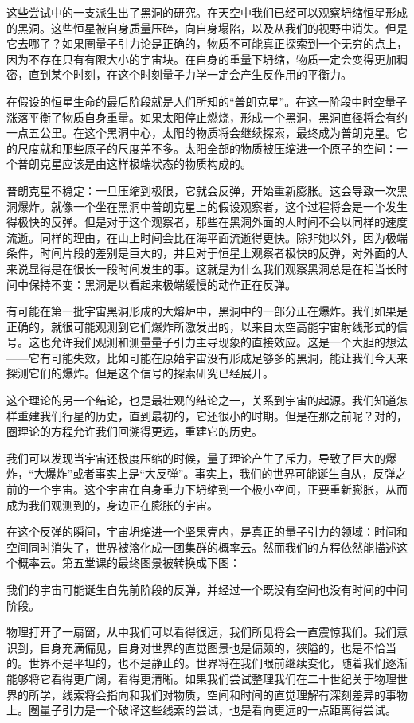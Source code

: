    这些尝试中的一支派生出了黑洞的研究。在天空中我们已经可以观察坍缩恒星形成的黑洞。这些恒星被自身质量压碎，向自身塌陷，以及从我们的视野中消失。但是它去哪了？如果圈量子引力论是正确的，物质不可能真正探索到一个无穷的点上，因为不存在只有有限大小的宇宙块。在自身的重量下坍缩，物质一定会变得更加稠密，直到某个时刻，在这个时刻量子力学一定会产生反作用的平衡力。

   在假设的恒星生命的最后阶段就是人们所知的“普朗克星”。在这一阶段中时空量子涨落平衡了物质自身重量。如果太阳停止燃烧，形成一个黑洞，黑洞直径将会有约一点五公里。在这个黑洞中心，太阳的物质将会继续探索，最终成为普朗克星。它的尺度就和那些原子的尺度差不多。太阳全部的物质被压缩进一个原子的空间：一个普朗克星应该是由这样极端状态的物质构成的。

   普朗克星不稳定：一旦压缩到极限，它就会反弹，开始重新膨胀。这会导致一次黑洞爆炸。就像一个坐在黑洞中普朗克星上的假设观察者，这个过程将会是一个发生得极快的反弹。但是对于这个观察者，那些在黑洞外面的人时间不会以同样的速度流逝。同样的理由，在山上时间会比在海平面流逝得更快。除非她以外，因为极端条件，时间片段的差别是巨大的，并且对于恒星上观察者极快的反弹，对外面的人来说显得是在很长一段时间发生的事。这就是为什么我们观察黑洞总是在相当长时间中保持不变：黑洞是以看起来极端缓慢的动作正在反弹。

   有可能在第一批宇宙黑洞形成的大熔炉中，黑洞中的一部分正在爆炸。我们如果是正确的，就很可能观测到它们爆炸所激发出的，以来自太空高能宇宙射线形式的信号。这也允许我们观测和测量量子引力主导现象的直接效应。这是一个大胆的想法——它有可能失效，比如可能在原始宇宙没有形成足够多的黑洞，能让我们今天来探测它们的爆炸。但是这个信号的探索研究已经展开。

   这个理论的另一个结论，也是最壮观的结论之一，关系到宇宙的起源。我们知道怎样重建我们行星的历史，直到最初的，它还很小的时期。但是在那之前呢？对的，圈理论的方程允许我们回溯得更远，重建它的历史。

   我们可以发现当宇宙还极度压缩的时候，量子理论产生了斥力，导致了巨大的爆炸，“大爆炸”或者事实上是“大反弹”。事实上，我们的世界可能诞生自从，反弹之前的一个宇宙。这个宇宙在自身重力下坍缩到一个极小空间，正要重新膨胀，从而成为我们观测到的，身边正在膨胀的宇宙。

   在这个反弹的瞬间，宇宙坍缩进一个坚果壳内，是真正的量子引力的领域：时间和空间同时消失了，世界被溶化成一团集群的概率云。然而我们的方程依然能描述这个概率云。第五堂课的最终图景被转换成下图：

   我们的宇宙可能诞生自先前阶段的反弹，并经过一个既没有空间也没有时间的中间阶段。

   物理打开了一扇窗，从中我们可以看得很远，我们所见将会一直震惊我们。我们意识到，自身充满偏见，自身对世界的直觉图景也是偏颇的，狭隘的，也是不恰当的。世界不是平坦的，也不是静止的。世界将在我们眼前继续变化，随着我们逐渐能够将它看得更广阔，看得更清晰。如果我们尝试整理我们在二十世纪关于物理世界的所学，线索将会指向和我们对物质，空间和时间的直觉理解有深刻差异的事物上。圈量子引力是一个破译这些线索的尝试，也是看向更远的一点距离得尝试。

\noindent
